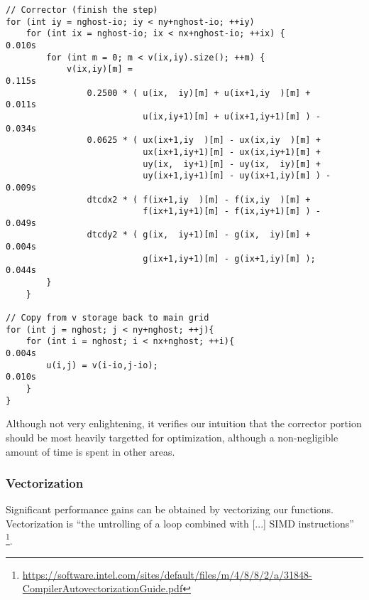 \begin{lstlisting}
// Corrector (finish the step)                                                                      
for (int iy = nghost-io; iy < ny+nghost-io; ++iy)                                                   
    for (int ix = nghost-io; ix < nx+nghost-io; ++ix) {             0.010s 
        for (int m = 0; m < v(ix,iy).size(); ++m) {                                                 
            v(ix,iy)[m] =                                           0.115s
                0.2500 * ( u(ix,  iy)[m] + u(ix+1,iy  )[m] +        0.011s 
                           u(ix,iy+1)[m] + u(ix+1,iy+1)[m] ) -      0.034s 
                0.0625 * ( ux(ix+1,iy  )[m] - ux(ix,iy  )[m] +                                      
                           ux(ix+1,iy+1)[m] - ux(ix,iy+1)[m] +                                      
                           uy(ix,  iy+1)[m] - uy(ix,  iy)[m] +                                      
                           uy(ix+1,iy+1)[m] - uy(ix+1,iy)[m] ) -    0.009s
                dtcdx2 * ( f(ix+1,iy  )[m] - f(ix,iy  )[m] +                                        
                           f(ix+1,iy+1)[m] - f(ix,iy+1)[m] ) -      0.049s
                dtcdy2 * ( g(ix,  iy+1)[m] - g(ix,  iy)[m] +        0.004s
                           g(ix+1,iy+1)[m] - g(ix+1,iy)[m] );       0.044s 
        }                                                                                           
    }                                                                                               
                                                                                                    
// Copy from v storage back to main grid                                                            
for (int j = nghost; j < ny+nghost; ++j){                                                           
    for (int i = nghost; i < nx+nghost; ++i){                       0.004s
        u(i,j) = v(i-io,j-io);                                      0.010s
    }                                                                                                          
} 
\end{lstlisting}

Although not very enlightening, it verifies our intuition that the corrector
portion should be most heavily targetted for optimization, although a 
non-negligible amount of time is spent in other areas.

\subsubsection{Vectorization}
\label{sec-profile-vectorization}
Significant performance gains can be obtained by vectorizing our functions.
Vectorization is ``the untrolling of a loop combined with [...] SIMD instructions''
\footnote{\url{https://software.intel.com/sites/default/files/m/4/8/8/2/a/31848-CompilerAutovectorizationGuide.pdf}}.

